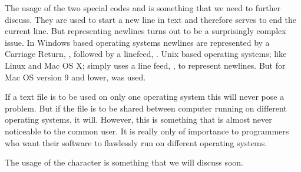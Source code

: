 \begin{description}
  The usage of the two special codes \cret and \lf is something that we
  need to further discuss. They are used to start a new line in text
  and therefore serves to end the current line. But representing
  newlines turns out to be a surprisingly complex issue. In Windows
  based operating systems newlines are represented by a Carriage
  Return, \cret, followed by a linefeed, \lf. Unix based operating
  systems; like Linux and Mac OS X; simply uses a line feed, \lf, to
  represent newlines. But for Mac OS version 9 and lower, \cret was
  used\cite{robbins:_common_newline,noria:_under_newlin_oreilly,editor:_end_line_story_rfc,tancig01:_apart_no_more_newline,corporation08:_creat_telep_applic_both_window_linux}.

  If a text file is to be used on only one operating system this will
  never pose a problem. But if the file is to be shared between
  computer running on different operating systems, it will. However,
  this is something that is almost never noticeable to the common
  user. It is really only of importance to programmers who want their
  software to flawlessly run on different operating systems.

  The usage of the \nul character is something that we will
  discuss soon.


\end{description}
